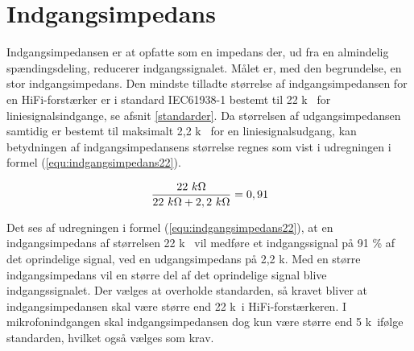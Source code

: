 \section{Indgangsimpedans}
\label{valg_indgangsimpedans}
Indgangsimpedansen er at opfatte som en impedans der, ud fra en almindelig spændingsdeling, reducerer indgangssignalet. Målet er, med den begrundelse, en stor indgangsimpedans. Den mindste tilladte størrelse af indgangsimpedansen for en HiFi-forstærker er i standard IEC61938-1 bestemt til 22 k\ohm~ for liniesignalsindgange, se afsnit \ref{standarder}. Da størrelsen af udgangsimpedansen samtidig er bestemt til maksimalt 2,2 k\ohm~ for en liniesignalsudgang, kan betydningen af indgangsimpedansens størrelse regnes som vist i udregningen i formel (\ref{equ:indgangsimpedans22}). 

\begin{equation}
\label{equ:indgangsimpedans22}
\frac{22~k\ohm}{22~k\ohm + 2,2~k\ohm} = 0,91
\end{equation}

Det ses af udregningen i formel (\ref{equ:indgangsimpedans22}), at en indgangsimpedans af størrelsen 22 k\ohm~ vil medføre et indgangssignal på 91 \% af det oprindelige signal, ved en udgangsimpedans på 2,2 k\ohm. Med en større indgangsimpedans vil en større del af det oprindelige signal blive indgangssignalet. Der vælges at overholde standarden, så kravet bliver at indgangsimpedansen skal være større end 22 k\ohm~i HiFi-forstærkeren. I mikrofonindgangen skal indgangsimpedansen dog kun være større end 5 k\ohm~ifølge standarden, hvilket også vælges som krav.

